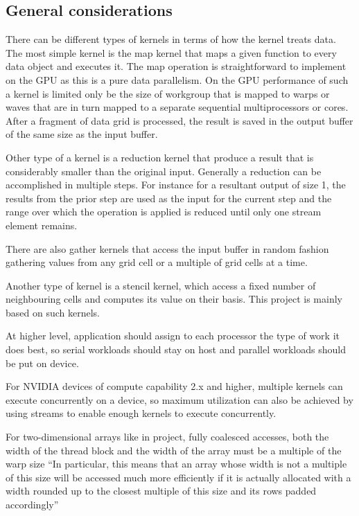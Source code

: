 \subsection{General considerations}
There can be different types of kernels in terms of how the kernel treats data. The most simple kernel is the map kernel that maps a given function to every data object and executes it. The map operation is straightforward to implement on the GPU as this is a pure data parallelism. On the GPU performance of such a kernel is limited only be the size of workgroup that is mapped to warps or waves that are in turn mapped to a separate sequential multiprocessors or cores. After a fragment of data grid is processed, the result is saved in the output buffer of the same size as the input buffer.

Other type of a kernel is a reduction kernel that produce a result that is considerably smaller than the original input. Generally a reduction can be accomplished in multiple steps. For instance for a resultant output of size 1, the results from the prior step are used as the input for the current step and the range over which the operation is applied is reduced until only one stream element remains.

There are also gather kernels that access the input buffer in random fashion gathering values from any grid cell or a multiple of grid cells at a time.

Another type of kernel is a stencil kernel, which access a fixed number of neighbouring cells and computes its value on their basis. This project is mainly based on such kernels.

At higher level, application should assign to each processor the type of work it does best, so serial workloads should stay on host and parallel workloads should be put on device. 

For NVIDIA devices of compute capability 2.x and higher, multiple kernels can execute concurrently on a device, so maximum utilization can also be achieved by using streams to enable enough kernels to execute concurrently.\cite{nvidia2012openclprog}

For two-dimensional arrays like in project, fully coalesced accesses, both the width of the thread block and the width of the array must be a multiple of the warp size \enquote{In particular, this means that an array whose width is not a multiple of this size will be accessed much more efficiently if it is actually allocated with a width rounded up to the closest multiple of this size and its rows padded accordingly}\cite{nvidia2012openclprog}

